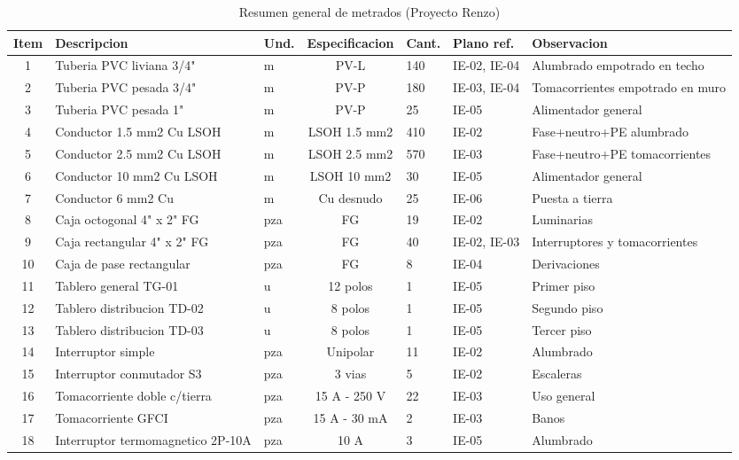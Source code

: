 \begin{landscape}
\begin{table}[H]
\centering
\tiny
\caption{Resumen general de metrados (Proyecto Renzo)}
\label{tab:resumen-metrados}
\begin{tabularx}{\textwidth}{c L{4.8cm} L{2.2cm} c L{1.8cm} L{3.0cm} Y}
\toprule
\textbf{Item} & \textbf{Descripcion} & \textbf{Und.} & \textbf{Especificacion} & \textbf{Cant.} & \textbf{Plano ref.} & \textbf{Observacion} \\
 & Tuberia PVC liviana 3/4" & m & PV-L & 140 & IE-02, IE-04 & Alumbrado empotrado en techo \\
2 & Tuberia PVC pesada 3/4" & m & PV-P & 180 & IE-03, IE-04 & Tomacorrientes empotrado en muro \\
3 & Tuberia PVC pesada 1" & m & PV-P & 25 & IE-05 & Alimentador general \\
4 & Conductor 1.5 mm2 Cu LSOH & m & LSOH 1.5 mm2 & 410 & IE-02 & Fase+neutro+PE alumbrado \\
5 & Conductor 2.5 mm2 Cu LSOH & m & LSOH 2.5 mm2 & 570 & IE-03 & Fase+neutro+PE tomacorrientes \\
6 & Conductor 10 mm2 Cu LSOH & m & LSOH 10 mm2 & 30 & IE-05 & Alimentador general \\
7 & Conductor 6 mm2 Cu & m & Cu desnudo & 25 & IE-06 & Puesta a tierra \\
8 & Caja octogonal 4" x 2" FG & pza & FG & 19 & IE-02 & Luminarias \\
9 & Caja rectangular 4" x 2" FG & pza & FG & 40 & IE-02, IE-03 & Interruptores y tomacorrientes \\
10 & Caja de pase rectangular & pza & FG & 8 & IE-04 & Derivaciones \\
11 & Tablero general TG-01 & u & 12 polos & 1 & IE-05 & Primer piso \\
12 & Tablero distribucion TD-02 & u & 8 polos & 1 & IE-05 & Segundo piso \\
13 & Tablero distribucion TD-03 & u & 8 polos & 1 & IE-05 & Tercer piso \\
14 & Interruptor simple & pza & Unipolar & 11 & IE-02 & Alumbrado \\
15 & Interruptor conmutador S3 & pza & 3 vias & 5 & IE-02 & Escaleras \\
16 & Tomacorriente doble c/tierra & pza & 15 A - 250 V & 22 & IE-03 & Uso general \\
17 & Tomacorriente GFCI & pza & 15 A - 30 mA & 2 & IE-03 & Banos \\
18 & Interruptor termomagnetico 2P-10A & pza & 10 A & 3 & IE-05 & Alumbrado \\

\end{tabularx}
\end{table}
\end{landscape}
